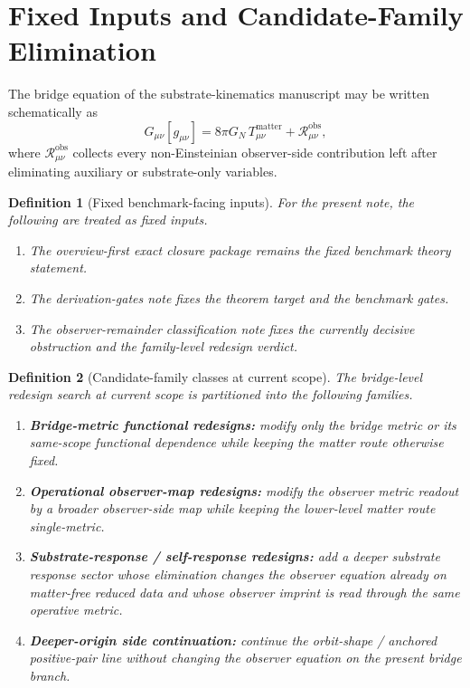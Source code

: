 \documentclass[11pt]{article}
\newcommand{\ObserverMetric}{g_{\mu\nu}}
\newcommand{\ObserverRem}{\mathcal R_{\mu\nu}^{\mathrm{obs}}}
\newcommand{\ExactClosure}{exact closure}
\newtheorem{definition}{Definition}
\begin{document}
\section{Fixed Inputs and Candidate-Family Elimination}

The bridge equation of the substrate-kinematics manuscript may be written schematically as
\begin{equation}
G_{\mu\nu}[\ObserverMetric]
=
8\pi G_N\,T_{\mu\nu}^{\mathrm{matter}}
+\ObserverRem,
\label{eq:bridge}
\end{equation}
where \(\ObserverRem\) collects every non-Einsteinian observer-side contribution left after eliminating auxiliary or substrate-only variables.

\begin{definition}[Fixed benchmark-facing inputs]
\label{def:inputs}
For the present note, the following are treated as fixed inputs.
\begin{enumerate}
    \item The overview-first \ExactClosure{} package remains the fixed benchmark theory statement.
    \item The derivation-gates note fixes the theorem target and the benchmark gates.
    \item The observer-remainder classification note fixes the currently decisive obstruction and the family-level redesign verdict.
\end{enumerate}
\end{definition}

\begin{definition}[Candidate-family classes at current scope]
\label{def:families}
The bridge-level redesign search at current scope is partitioned into the following families.
\begin{enumerate}
    \item \textbf{Bridge-metric functional redesigns:} modify only the bridge metric or its same-scope functional dependence while keeping the matter route otherwise fixed.
    \item \textbf{Operational observer-map redesigns:} modify the observer metric readout by a broader observer-side map while keeping the lower-level matter route single-metric.
    \item \textbf{Substrate-response / self-response redesigns:} add a deeper substrate response sector whose elimination changes the observer equation already on matter-free reduced data and whose observer imprint is read through the same operative metric.
    \item \textbf{Deeper-origin side continuation:} continue the orbit-shape / anchored positive-pair line without changing the observer equation on the present bridge branch.
\end{enumerate}
\end{definition}
\end{document}
